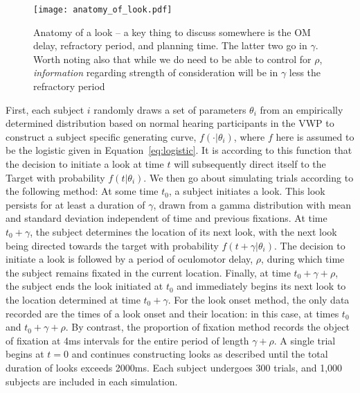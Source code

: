 \begin{figure}[H]
\centering
\texttt{[image: anatomy\_of\_look.pdf]}
\caption{Anatomy of a look -- a key thing to discuss somewhere is the OM delay, refractory period, and planning time. The latter two go in $\gamma$. Worth noting also that while we do need to be able to control for $\rho$, \textit{information} regarding strength of consideration will be in $\gamma$ less the refractory period}
\label{fig:anatomy_of_look}
\end{figure}


First, each subject $i$ randomly draws a set of parameters $\theta_i$ from an empirically determined distribution based on normal hearing participants in the VWP \cite{FarrisTrimble2014} to construct a subject specific generating curve, $f(\cdot | \theta_i)$, where $f$ here is assumed to be the logistic given in Equation~\ref{eq:logistic}.   It is according to this function that the decision to initiate a look at time $t$ will subsequently direct itself to the Target with probability $f(t|\theta_i)$. We then go about simulating trials according to the following method: At some time $t_0$, a subject initiates a look. This look persists for at least a duration of $\gamma$, drawn from a gamma distribution with mean and standard deviation independent of time and previous fixations. At time $t_0+\gamma$, the subject determines the location of its next look, with the next look being directed towards the target with probability $f(t+\gamma | \theta_i)$. The decision to initiate a look is followed by a period of oculomotor delay, $\rho$, during which time the subject remains fixated in the current location. Finally, at time $t_0 + \gamma + \rho$, the subject ends the look initiated at $t_0$ and immediately begins its next look to the location determined at time $t_0 + \gamma$. For the look onset method, the only data recorded are the times of a look onset and their location: in this case, at times $t_0$ and $t_0 + \gamma + \rho$. By contrast, the proportion of fixation method records the object of fixation at 4ms intervals for the entire period of length $\gamma + \rho$. A single trial begins at $t = 0$ and continues constructing looks as described until the total duration of looks exceeds 2000ms. Each subject undergoes 300 trials, and 1,000 subjects are included in each simulation.

